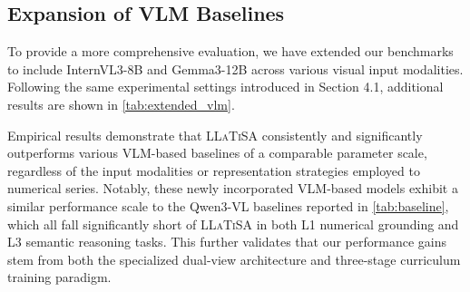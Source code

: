 \documentclass[11pt]{article}
\begin{document}
\begin{table}[t]
\centering
{}
\caption{Extended ablation study results on the curriculum learning strategy.}
\label{tab:extended_albations}
\end{table}

\subsection{Expansion of VLM Baselines}
To provide a more comprehensive evaluation, we have extended our benchmarks to include InternVL3-8B \cite{internvl3} and Gemma3-12B \cite{gemma3} across various visual input modalities. Following the same experimental settings introduced in Section 4.1, additional results are shown in \cref{tab:extended_vlm}.

Empirical results demonstrate that \textsc{LLaTiSA} consistently and significantly outperforms various VLM-based baselines of a comparable parameter scale, regardless of the input modalities or representation strategies employed to numerical series. Notably, these newly incorporated VLM-based models exhibit a similar performance scale to the Qwen3-VL baselines reported in \cref{tab:baseline}, which all fall significantly short of \textsc{LLaTiSA} in both L1 numerical grounding and L3 semantic reasoning tasks. This further validates that our performance gains stem from both the specialized dual-view architecture and three-stage curriculum training paradigm.
\end{document}
